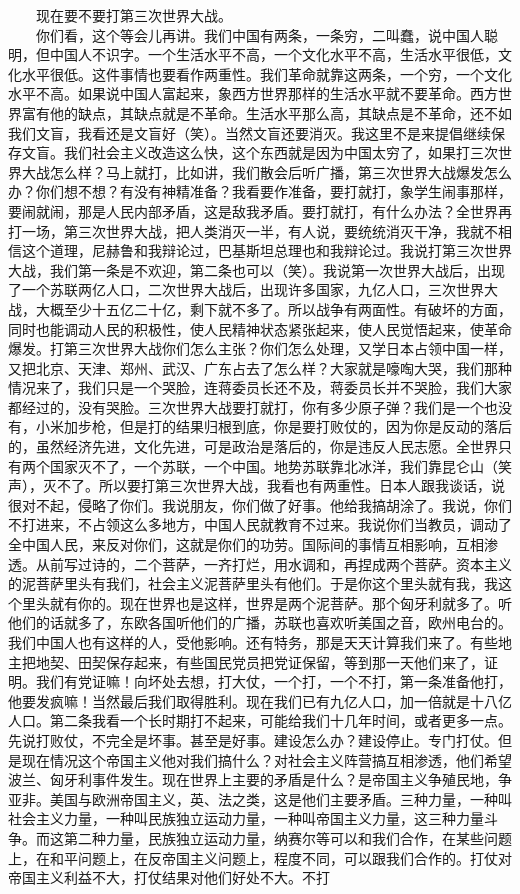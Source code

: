 \documentclass[cn,11pt,chinese]{elegantbook}
\begin{document}
　　现在要不要打第三次世界大战。\\
　　你们看，这个等会儿再讲。我们中国有两条，一条穷，二叫蠢，说中国人聪明，但中国人不识字。一个生活水平不高，一个文化水平不高，生活水平很低，文化水平很低。这件事情也要看作两重性。我们革命就靠这两条，一个穷，一个文化水平不高。如果说中国人富起来，象西方世界那样的生活水平就不要革命。西方世界富有他的缺点，其缺点就是不革命。生活水平那么高，其缺点是不革命，还不如我们文盲，我看还是文盲好（笑）。当然文盲还要消灭。我这里不是来提倡继续保存文盲。我们社会主义改造这么快，这个东西就是因为中国太穷了，如果打三次世界大战怎么样？马上就打，比如讲，我们散会后听广播，第三次世界大战爆发怎么办？你们想不想？有没有神精准备？我看要作准备，要打就打，象学生闹事那样，要闹就闹，那是人民内部矛盾，这是敌我矛盾。要打就打，有什么办法？全世界再打一场，第三次世界大战，把人类消灭一半，有人说，要统统消灭干净，我就不相信这个道理，尼赫鲁和我辩论过，巴基斯坦总理也和我辩论过。我说打第三次世界大战，我们第一条是不欢迎，第二条也可以（笑）。我说第一次世界大战后，出现了一个苏联两亿人口，二次世界大战后，出现许多国家，九亿人口，三次世界大战，大概至少十五亿二十亿，剩下就不多了。所以战争有两面性。有破坏的方面，同时也能调动人民的积极性，使人民精神状态紧张起来，使人民觉悟起来，使革命爆发。打第三次世界大战你们怎么主张？你们怎么处理，又学日本占领中国一样，又把北京、天津、郑州、武汉、广东占去了怎么样？大家就是嚎啕大哭，我们那种情况来了，我们只是一个哭脸，连蒋委员长还不及，蒋委员长并不哭脸，我们大家都经过的，没有哭脸。三次世界大战要打就打，你有多少原子弹？我们是一个也没有，小米加步枪，但是打的结果归根到底，你是要打败仗的，因为你是反动的落后的，虽然经济先进，文化先进，可是政治是落后的，你是违反人民志愿。全世界只有两个国家灭不了，一个苏联，一个中国。地势苏联靠北冰洋，我们靠昆仑山（笑声），灭不了。所以要打第三次世界大战，我看也有两重性。日本人跟我谈话，说很对不起，侵略了你们。我说朋友，你们做了好事。他给我搞胡涂了。我说，你们不打进来，不占领这么多地方，中国人民就教育不过来。我说你们当教员，调动了全中国人民，来反对你们，这就是你们的功劳。国际间的事情互相影响，互相渗透。从前写过诗的，二个菩萨，一齐打烂，用水调和，再捏成两个菩萨。资本主义的泥菩萨里头有我们，社会主义泥菩萨里头有他们。于是你这个里头就有我，我这个里头就有你的。现在世界也是这样，世界是两个泥菩萨。那个匈牙利就多了。听他们的话就多了，东欧各国听他们的广播，苏联也喜欢听美国之音，欧州电台的。我们中国人也有这样的人，受他影响。还有特务，那是天天计算我们来了。有些地主把地契、田契保存起来，有些国民党员把党证保留，等到那一天他们来了，证明。我们有党证嘛！向坏处去想，打大仗，一个打，一个不打，第一条准备他打，他要发疯嘛！当然最后我们取得胜利。现在我们已有九亿人口，加一倍就是十八亿人口。第二条我看一个长时期打不起来，可能给我们十几年时间，或者更多一点。先说打败仗，不完全是坏事。甚至是好事。建设怎么办？建设停止。专门打仗。但是现在情况这个帝国主义他对我们搞什么？对社会主义阵营搞互相渗透，他们希望波兰、匈牙利事件发生。现在世界上主要的矛盾是什么？是帝国主义争殖民地，争亚非。美国与欧洲帝国主义，英、法之类，这是他们主要矛盾。三种力量，一种叫社会主义力量，一种叫民族独立运动力量，一种叫帝国主义力量，这三种力量斗争。而这第二种力量，民族独立运动力量，纳赛尔等可以和我们合作，在某些问题上，在和平问题上，在反帝国主义问题上，程度不同，可以跟我们合作的。打仗对帝国主义利益不大，打仗结果对他们好处不大。不打
\end{document}
